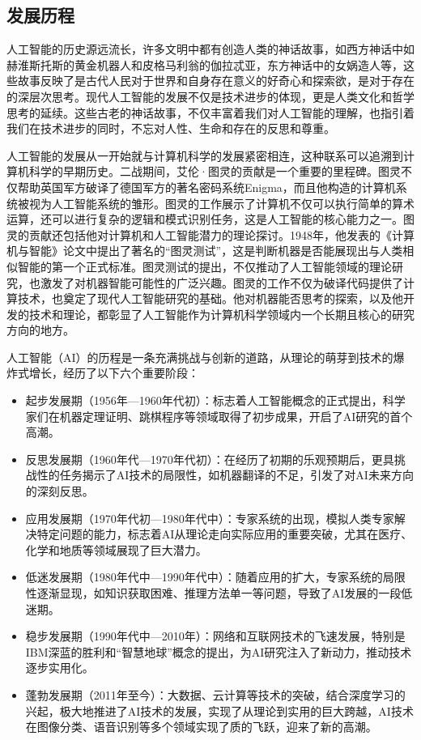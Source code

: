 \subsection[发展历程]{发展历程}

人工智能的历史源远流长，许多文明中都有创造人类的神话故事，如西方神话中如赫淮斯托斯的黄金机器人和皮格马利翁的伽拉忒亚，东方神话中的女娲造人等，这些故事反映了是古代人民对于世界和自身存在意义的好奇心和探索欲，是对于存在的深层次思考。现代人工智能的发展不仅是技术进步的体现，更是人类文化和哲学思考的延续。这些古老的神话故事，不仅丰富着我们对人工智能的理解，也指引着我们在技术进步的同时，不忘对人性、生命和存在的反思和尊重。

人工智能的发展从一开始就与计算机科学的发展紧密相连，这种联系可以追溯到计算机科学的早期历史。二战期间，艾伦·图灵的贡献是一个重要的里程碑。图灵不仅帮助英国军方破译了德国军方的著名密码系统Enigma，而且他构造的计算机系统被视为人工智能系统的雏形。图灵的工作展示了计算机不仅可以执行简单的算术运算，还可以进行复杂的逻辑和模式识别任务，这是人工智能的核心能力之一。图灵的贡献还包括他对计算机和人工智能潜力的理论探讨。1948年，他发表的《计算机与智能》论文中提出了著名的“图灵测试”，这是判断机器是否能展现出与人类相似智能的第一个正式标准。图灵测试的提出，不仅推动了人工智能领域的理论研究，也激发了对机器智能可能性的广泛兴趣。图灵的工作不仅为破译代码提供了计算技术，也奠定了现代人工智能研究的基础。他对机器能否思考的探索，以及他开发的技术和理论，都彰显了人工智能作为计算机科学领域内一个长期且核心的研究方向的地方。

人工智能（AI）的历程是一条充满挑战与创新的道路，从理论的萌芽到技术的爆炸式增长，经历了以下六个重要阶段：
\begin{itemize}
    \item 起步发展期（1956年—1960年代初）：标志着人工智能概念的正式提出，科学家们在机器定理证明、跳棋程序等领域取得了初步成果，开启了AI研究的首个高潮。
    \item 反思发展期（1960年代—1970年代初）：在经历了初期的乐观预期后，更具挑战性的任务揭示了AI技术的局限性，如机器翻译的不足，引发了对AI未来方向的深刻反思。
    \item 应用发展期（1970年代初—1980年代中）：专家系统的出现，模拟人类专家解决特定问题的能力，标志着AI从理论走向实际应用的重要突破，尤其在医疗、化学和地质等领域展现了巨大潜力。
    \item 低迷发展期（1980年代中—1990年代中）：随着应用的扩大，专家系统的局限性逐渐显现，如知识获取困难、推理方法单一等问题，导致了AI发展的一段低迷期。
    \item 稳步发展期（1990年代中—2010年）：网络和互联网技术的飞速发展，特别是IBM深蓝的胜利和“智慧地球”概念的提出，为AI研究注入了新动力，推动技术逐步实用化。
    \item 蓬勃发展期（2011年至今）：大数据、云计算等技术的突破，结合深度学习的兴起，极大地推进了AI技术的发展，实现了从理论到实用的巨大跨越，AI技术在图像分类、语音识别等多个领域实现了质的飞跃，迎来了新的高潮。
\end{itemize}


